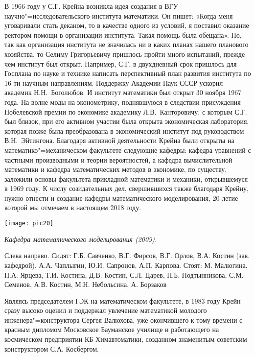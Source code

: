 В 1966 году у С.Г. Крейна возникла идея создания в ВГУ научно"=исследовательского института математики. Он пишет: «Когда меня уговаривали стать деканом, то в качестве одного из условий, я поставил оказание ректором помощи в организации института. Такая помощь была обещана». Но, так как организация института не значилась ни в каких планах нашего планового хозяйства, то Селиму Григорьевичу пришлось пройти много испытаний, прежде чем институт был открыт. Например, С.Г. в двухдневный срок пришлось для Госплана по науке и технике написать перспективный план развития института по 16-ти научным направлениям. Поддержку Академии Наук СССР ускорил академик Н.Н.~Боголюбов. И институт математики был открыт 30      ноября 1967 года.
На волне моды на эконометрику, поднявшуюся в следствии присуждения Нобелевской премии по экономике академику Л.В.~Канторовичу, с которым С.Г. был близок, при его активном участии была открыта экономическая лаборатория, которая позже была преобразована в экономический институт под руководством В.Н.~Эйтингона. Благодаря активной деятельности Крейна были открыты на математико"=механическом факультете следующие кафедры: кафедра уравнений с частными производными и теории вероятностей, а кафедра вычислительной математики и кафедра математических методов в экономике, по существу, заложили основы факультета прикладной математики и механики, открывшемуся в 1969 году.
К числу созидательных дел, свершившихся также благодаря Крейну, нужно отнести и создание кафедры математического моделирования, 20-летие которой мы отмечаем в настоящем 2018 году.


\begin{center}

\texttt{[image: pic20]}


{\it Кафедра математического моделирования (2009).

Слева направо. Сидят: Г.Б. Савченко, В.Г. Фирсов, В.Г. Орлов, В.А. Костин (зав. кафедрой), А.А. Чаплыгин, Ю.И. Сапронов, А.П. Карпова. Стоят: М. Малюгина, Н.А. Ярцева, Т.И. Костина, Д.В. Костин, С.Л. Царев, Н.Б. Подтынникова, С.М. Семенов, А.В. Костин, М.Н. Небольсина, А. Борзаков
}
\end{center}

Являясь председателем ГЭК на математическом факультете, в 1983 году Крейн сразу высоко оценил и поддержал увлечение математикой молодого инженера"=конструктора Сергея Валюхова, уже окончившего к тому времени с красным дипломом Московское Бауманское училище и работающего на космическом предприятии КБ Химавтоматики, созданном знаменитым советским конструктором С.А. Косбергом.



